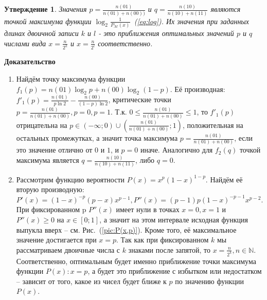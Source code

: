 \documentclass[12pt]{article}
\newtheorem{sttm}{Утверждение}
\begin{document}
	\begin{sttm}\label{derivative}Значения $p = \frac{n(01)}{n(01)+n(00))}$ и $q = \frac{n(10)}{n(10)+n(11)}$ являются точкой максимума функции $\log_2{\frac{1}{P_{\mathcal{M}}(x)}}$~(\ref{eq:log}). Их значения при заданных длинах двоичной записи $k$ и $l$ - это приближения оптимальных значений $p$ и $q$ числами вида $x=\frac{n}{2^{k}}$ и $x=\frac{n}{2^{l}}$ соответственно.\end{sttm}
	{\bf Доказательство}
	\begin{enumerate}
	\item Найдём точку максимума функции $f_1(p) = n(01)\log_2{p} + n(00)\log_2{(1-p)}$. Её производная: $f'_1(p) = \frac{n(01)}{p\ln{2}} - \frac{n(00)}{(1-p)\ln{2}}$, критические точки $p=\frac{n(01)}{n(01)+n(00)},p=0,p=1$. Т.к. $0\le\frac{n(01)}{n(01)+n(00)}\le1$, то $f'_1(p)$ отрицательна на $p\in(-\infty;0)\cup\left(\frac{n(01)}{n(01)+n(00)};1\right)$, положительная на остальных промежутках, а значит точка максимума $p = \frac{n(01)}{n(01)+n(00)}$, если это значение отлично от $0$ и $1$, и $p=0$ иначе. Аналогично для $f_2(q)$ точкой максимума является $q=\frac{n(10)}{n(10)+n(11)}$, либо $q=0$.
	
	\item Рассмотрим функцию вероятности $P(x) = x^p(1-x)^{1-p}$. Найдём её вторую производную: $P'(x) = (1-x)^{-p} (p-x) x^{p-1}, P''(x)=(p-1) p (1-x)^{-p-1} x^{p-2}$. При фиксированном p $P''(x)$ имеет нули в точках $x=0, x=1$ и $P''(x)\ge0$ на $x\in[0;1]$, а значит на этом интервале исходная функция выпукла вверх -- см. Рис.~(\ref{pic:P(x,p)}). Кроме того, её максимальное значение достигается при $x=p$. Так как при фиксированном $k$ мы рассматриваем двоичные числа с $k$ знаками после запятой, то $x=\frac{n}{2^{k}},n\in\mathbb{N}$. Соответственно, оптимальным будет именно приближение точки максимума функции $P(x): x = p$, а будет это приближение с избытком или недостатком -- зависит от того, какое из чисел будет ближе к $p$ по значению функции $P(x)$.
	

\end{enumerate}
\end{document}
